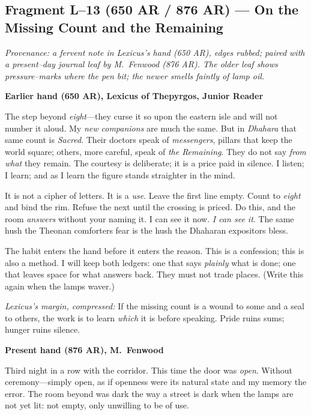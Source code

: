 \documentclass[11pt]{article}
\begin{document}
\subsection{Fragment L--13 (650 AR / 876 AR) — On the Missing Count and the Remaining}
\label{frag:l13}

\noindent\textit{Provenance: a fervent note in Lexicus’s hand (650 AR), edges rubbed; paired with a present–day journal leaf by M.\ Fenwood (876 AR). The older leaf shows pressure–marks where the pen bit; the newer smells faintly of lamp oil.}

\medskip
\noindent\textbf{Earlier hand (650 AR), Lexicus of Thepyrgos, Junior Reader}

The step beyond \emph{eight}—they curse it so upon the eastern isle and will not number it aloud. My \emph{new companions} are much the same. But in \textit{Dhahara} that same count is \emph{Sacred}. Their doctors speak of \emph{messengers}, pillars that keep the world square; others, more careful, speak of \emph{the Remaining}. They do not say \emph{from what} they remain. The courtesy is deliberate; it is a price paid in silence. I listen; I learn; and as I learn the figure stands straighter in the mind.

It is not a cipher of letters. It is a \emph{use}. Leave the first line empty. Count to \emph{eight} and bind the rim. Refuse the next until the crossing is priced. Do this, and the room \emph{answers} without your naming it. I can see it now. \emph{I can see it}. The same hush the Theonan comforters fear is the hush the Dhaharan expositors bless.

The habit enters the hand before it enters the reason. This is a confession; this is also a method. I will keep both ledgers: one that says \emph{plainly} what is done; one that leaves space for what answers back. They must not trade places. (Write this again when the lamps waver.)

\medskip
\noindent\textit{Lexicus’s margin, compressed:} If the missing count is a wound to some and a seal to others, the work is to learn \emph{which} it is before speaking. Pride ruins sums; hunger ruins silence.

\medskip
\noindent\textbf{Present hand (876 AR), M.\ Fenwood}

Third night in a row with the corridor. This time the door was \emph{open}. Without ceremony—simply open, as if openness were its natural state and my memory the error. The room beyond was dark the way a street is dark when the lamps are not yet lit: not empty, only unwilling to be of use.
\end{document}
